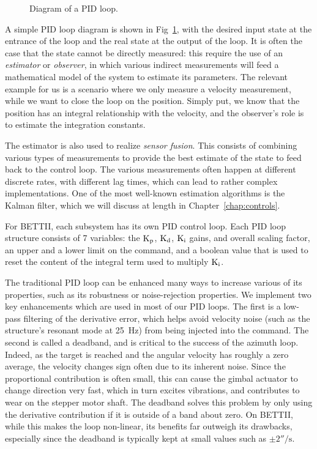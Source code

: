 \documentclass{standalone}
\begin{document}
\begin{figure}[!ht]
	\centering
	
	\caption[PID loop]{Diagram of a PID loop.}
	\label{fig:SimplePID}
    \end{figure}



A simple PID loop diagram is shown in Fig~\ref{fig:SimplePID}, with the desired input state at the entrance of the loop and the real state at the output of the loop. It is often the case that the state cannot be directly measured: this require the use of an \textit{estimator} or \textit{observer}, in which various indirect measurements will feed a mathematical model of the system to estimate its parameters. The relevant example for us is a scenario where we only measure a velocity measurement, while we want to close the loop on the position. Simply put, we know that the position has an integral relationship with the velocity, and the observer's role is to estimate the integration constants.

The estimator is also used to realize \textit{sensor fusion}. This consists of combining various types of measurements to provide the best estimate of the state to feed back to the control loop. The various measurements often happen at different discrete rates, with different lag times, which can lead to rather complex implementations. One of the most well-known estimation algorithms is the Kalman filter, which we will discuss at length in Chapter~\ref{chap:controls}. 

For BETTII, each subsystem has its own PID control loop. Each PID loop structure consists of 7 variables: the $\textrm{K}_\textrm{p}$, $\textrm{K}_\textrm{d}$, $\textrm{K}_\textrm{i}$ gains, and overall scaling factor, an upper and a lower limit on the command, and a boolean value that is used to reset the content of the integral term used to multiply $\textrm{K}_\textrm{i}$. 

The traditional PID loop can be enhanced many ways to increase various of its properties, such as its robustness or noise-rejection properties. We implement two key enhancements which are used in most of our PID loops. The first is a low-pass filtering of the derivative error, which helps avoid velocity noise (such as the structure's resonant mode at \SI{25}{\hertz}) from being injected into the command. The second is called a deadband, and is critical to the success of the azimuth loop. Indeed, as the target is reached and the angular velocity has roughly a zero average, the velocity changes sign often due to its inherent noise. Since the proportional contribution is often small, this can cause the gimbal actuator to change direction very fast, which in turn excites vibrations, and contributes to wear on the stepper motor shaft. The deadband solves this problem by only using the derivative contribution if it is outside of a band about zero. On BETTII, while this makes the loop non-linear, its benefits far outweigh its drawbacks, especially since the deadband is typically kept at small values such as $\pm \ang{;;2}\si{\per\second}$.
\end{document}
